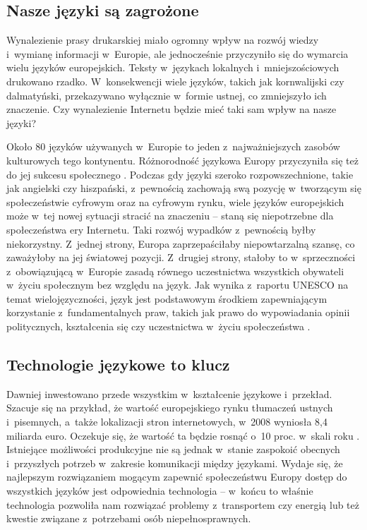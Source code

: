 \begin{multicols}{2}
\subsection{Nasze języki są zagrożone} 

Wynalezienie prasy drukarskiej miało ogromny wpływ na rozwój wiedzy
i~wymianę informacji w~Europie, ale jednocześnie przyczyniło się
do wymarcia wielu języków europejskich. Teksty w~językach lokalnych
i~mniejszościowych drukowano rzadko. W~konsekwencji wiele języków,
takich jak kornwalijski czy dalmatyński, przekazywano wyłącznie
w~formie ustnej, co zmniejszyło ich znaczenie. Czy wynalezienie
Internetu będzie mieć taki sam wpływ na nasze języki? 


Około 80 języków używanych w~Europie to jeden z~najważniejszych
zasobów kulturowych tego kontynentu. Różnorodność językowa
Europy przyczyniła się też do jej sukcesu społecznego \cite{EC2}.
Podczas gdy języki szeroko rozpowszechnione, takie jak angielski czy
hiszpański, z~pewnością zachowają swą pozycję w~tworzącym się
społeczeństwie cyfrowym oraz na cyfrowym rynku, wiele języków
europejskich może w~tej nowej sytuacji stracić na znaczeniu –
staną się niepotrzebne dla społeczeństwa ery Internetu. Taki
rozwój wypadków z~pewnością byłby niekorzystny. Z~jednej strony,
Europa zaprzepaściłaby niepowtarzalną szansę, co zaważyłoby na
jej światowej pozycji. Z~drugiej strony, stałoby to w~sprzeczności
z~obowiązującą w~Europie zasadą równego uczestnictwa wszystkich
obywateli w~życiu społecznym bez względu na język. Jak wynika
z~raportu UNESCO na temat wielojęzyczności, język jest podstawowym
środkiem zapewniającym korzystanie z~fundamentalnych praw, takich
jak prawo do wypowiadania opinii politycznych, kształcenia się czy
uczestnictwa w~życiu społeczeństwa \cite{Unesco1}. 

\subsection{Technologie językowe to klucz} 

Dawniej inwestowano przede wszystkim w~kształcenie językowe
i~przekład. Szacuje się na przykład, że wartość europejskiego
rynku tłumaczeń ustnych i~pisemnych, a~także lokalizacji stron
internetowych, w~2008 wyniosła 8,4 miliarda euro. Oczekuje się, że
wartość ta będzie rosnąć o~10 proc. w~skali roku \cite{EC3}.
Istniejące możliwości produkcyjne nie są jednak w~stanie
zaspokoić obecnych i~przyszłych potrzeb w~zakresie komunikacji
między językami. Wydaje się, że najlepszym rozwiązaniem mogącym
zapewnić społeczeństwu Europy dostęp do wszystkich języków jest
odpowiednia technologia – w~końcu to właśnie technologia
pozwoliła nam rozwiązać problemy z~transportem czy energią lub
też kwestie związane z~potrzebami osób niepełnosprawnych.


\end{multicols}
